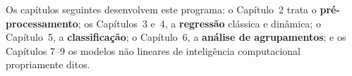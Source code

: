 Os capítulos seguintes desenvolvem este programa: o Capítulo~2 trata o
\textbf{pré-processamento}; os Capítulos~3 e~4, a \textbf{regressão}
clássica e dinâmica; o Capítulo~5, a \textbf{classificação}; o
Capítulo~6, a \textbf{análise de agrupamentos}; e os Capítulos 7--9 os
modelos não lineares de inteligência computacional propriamente ditos.



